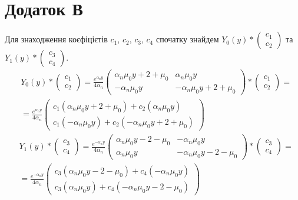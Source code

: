 \documentclass[a4paper,14pt]{extarticle}
\numberwithin{equation}{section}
\begin{document}
\section{Додаток В}\label{ap_B_1}
Для знаходження коєфіцієтів $c_1$, $c_2$, $c_3$, $c_4$ спочатку
знайдем $Y_0(y) * \begin{pmatrix}c_1 \\ c_2\end{pmatrix}$ та $Y_1(y) * \begin{pmatrix}c_3 \\ c_4\end{pmatrix}$.
\begin{align*}
    &Y_0(y) * \begin{pmatrix}c_1 \\ c_2\end{pmatrix} = \frac{e^{\alpha_n y}}{4\alpha_n} \begin{pmatrix}
        \alpha_n \mu_0 y + 2 + \mu_0 & \alpha_n \mu_0 y \\
        -\alpha_n \mu_0 y & -\alpha_n \mu_0 y + 2 + \mu_0
        \end{pmatrix} * \begin{pmatrix}c_1 \\ c_2\end{pmatrix} = \\
    &=\frac{e^{\alpha_n y}}{4\alpha_n} \begin{pmatrix}
        c_1(\alpha_n \mu_0 y + 2 + \mu_0) + c_2(\alpha_n \mu_0 y) \\
        c_1(-\alpha_n \mu_0 y) + c_2(-\alpha_n \mu_0 y + 2 + \mu_0)
        \end{pmatrix}
\end{align*}
\begin{align*}
    &Y_1(y) * \begin{pmatrix}c_3 \\ c_4\end{pmatrix} = \frac{e^{-\alpha_n y}}{4\alpha_n} \begin{pmatrix}
        \alpha_n \mu_0 y - 2 - \mu_0 & -\alpha_n \mu_0 y \\
        \alpha_n \mu_0 y & -\alpha_n \mu_0 y - 2 - \mu_0
        \end{pmatrix} * \begin{pmatrix}c_3 \\ c_4\end{pmatrix} = \\
    &=\frac{e^{-\alpha_n y}}{4\alpha_n} \begin{pmatrix}
        c_3(\alpha_n \mu_0 y - 2 - \mu_0) + c_4(-\alpha_n \mu_0 y) \\
        c_3(\alpha_n \mu_0 y) + c_4(-\alpha_n \mu_0 y - 2 - \mu_0)
        \end{pmatrix}
\end{align*}
\end{document}
